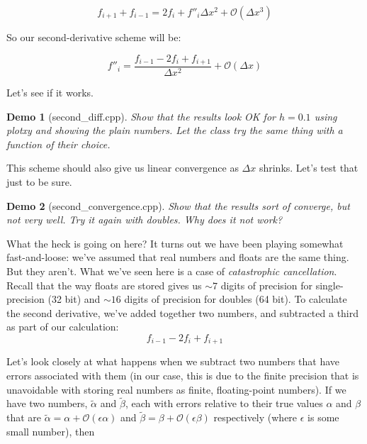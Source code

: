\documentclass{article}
\theoremstyle{demo}
\newtheorem{demo}{Demo}[section]
\begin{document}
\begin{equation}
    f_{i+1} + f_{i-1} = 2f_i + f''_i \Delta x^2 + \mathcal{O}(\Delta x^3)
\end{equation}

So our second-derivative scheme will be:

\begin{equation}
    f''_i = \frac{f_{i-1} - 2f_{i} + f_{i+1}}{\Delta x^2} + \mathcal{O}(\Delta
    x)
\end{equation}

Let's see if it works.

\begin{demo}[second\_diff.cpp]
    Show that the results look OK for $h=0.1$ using \textit{plotxy} and showing
    the plain numbers.  Let the class try the same thing with a function of
    their choice.
\end{demo}

This scheme should also give us linear convergence as $\Delta x$ shrinks. Let's
test that just to be sure.
\begin{demo}[second\_convergence.cpp]
    Show that the results \textit{sort of} converge, but not very well.  Try it
    again with doubles.  Why does it not work?
\end{demo}

What the heck is going on here?  It turns out we have been playing somewhat
fast-and-loose: we've assumed that real numbers and floats are the same thing.
But they aren't.  What we've seen here is a case of \textit{catastrophic
cancellation}.  Recall that the way floats are stored gives us $\sim7$ digits of
precision for single-precision (32 bit) and $\sim16$ digits of precision for
doubles (64 bit).  To calculate the second derivative, we've added together two
numbers, and subtracted a third as part of our calculation:
\begin{equation}
    f_{i-1} - 2f_{i} + f_{i+1}
\end{equation}

Let's look closely at what happens when we subtract two numbers that have errors
associated with them (in our case, this is due to the finite precision that is
unavoidable with storing real numbers as finite, floating-point numbers).  If we
have two numbers, $\tilde\alpha$ and $\tilde\beta$, each with errors relative to their
true values $\alpha$ and $\beta$ that are
$\tilde\alpha = \alpha + \mathcal{O}(\epsilon \alpha)$ and  $\tilde\beta = \beta
+ \mathcal{O}(\epsilon \beta)$ respectively (where $\epsilon$ is some small
number), then
\end{document}
